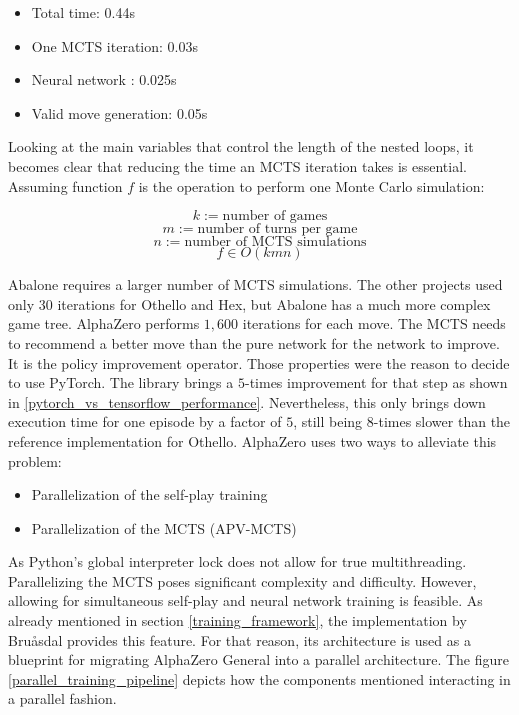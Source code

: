 \begin{itemize}
    \item Total time: 0.44s
    \item One MCTS iteration: 0.03s
    \item Neural network : 0.025s
    \item Valid move generation: 0.05s
\end{itemize}

Looking at the main variables that control the length of the nested loops, it becomes clear that reducing the time an MCTS iteration takes is essential. Assuming function $f$ is the operation to perform one Monte Carlo simulation:

$$
    k := \text{number of games}
$$
$$
    m := \text{number of turns per game}
$$
$$
    n := \text{number of MCTS simulations}
$$
$$
    f \in O(kmn)
$$

Abalone requires a larger number of MCTS simulations. The other projects \cite{bruasdal_deep_2020,thakoor_learning_nodate} used only 30 iterations for Othello and Hex, but Abalone has a much more complex game tree. AlphaZero performs $1,600$ iterations \cite[p. 11]{silver_mastering_2017} for each move. The MCTS needs to recommend a better move than the pure network for the network to improve. It is the policy improvement operator. Those properties were the reason to decide to use PyTorch. The library brings a $5$-times improvement for that step as shown in \ref{pytorch_vs_tensorflow_performance}. Nevertheless, this only brings down execution time for one episode by a factor of $5$, still being $8$-times slower than the reference implementation for Othello. AlphaZero uses two ways to alleviate this problem:

\begin{itemize}
    \item Parallelization of the self-play training
    \item Parallelization of the MCTS (APV-MCTS)
\end{itemize}

As Python's global interpreter lock \cite{noauthor_globalinterpreterlock_nodate} does not allow for true multithreading. Parallelizing the MCTS poses significant complexity and difficulty. However, allowing for simultaneous self-play and neural network training is feasible. As already mentioned in section \ref{training_framework}, the implementation by Bruåsdal \cite{bruasdal_deep_2020} provides this feature. For that reason, its architecture is used as a blueprint for migrating AlphaZero General into a parallel architecture. The figure \ref{parallel_training_pipeline} depicts how the components mentioned interacting in a parallel fashion.

